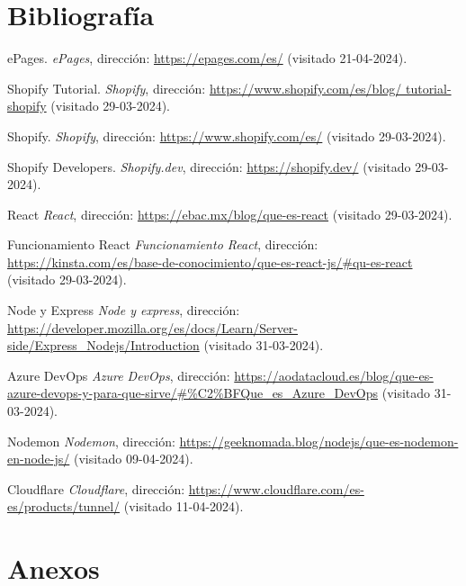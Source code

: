 \documentclass[12pt]{article}
\begin{document}
\section{Bibliografía}
\renewcommand{\refname}{}
\begin{thebibliography}{100} %
    
    ePages. 
    \textit{ePages}, dirección: \url{https://epages.com/es/} (visitado 21-04-2024).

    Shopify Tutorial. 
    \textit{Shopify}, dirección: \url{https://www.shopify.com/es/blog/
    tutorial-shopify} (visitado 29-03-2024).

    Shopify. 
    \textit{Shopify}, dirección: \url{https://www.shopify.com/es/} (visitado 29-03-2024).

    Shopify Developers. 
    \textit{Shopify.dev}, dirección: \url{https://shopify.dev/} (visitado 29-03-2024).

    React
    \textit{React}, dirección: \url{https://ebac.mx/blog/que-es-react} (visitado 29-03-2024).

    Funcionamiento React
    \textit{Funcionamiento React}, dirección: \url{https://kinsta.com/es/base-de-conocimiento/que-es-react-js/#qu-es-react} (visitado 29-03-2024).

    Node y Express
    \textit{Node y express}, dirección: \url{https://developer.mozilla.org/es/docs/Learn/Server-side/Express_Nodejs/Introduction} (visitado 31-03-2024).

    Azure DevOps
    \textit{Azure DevOps}, dirección: \url{https://aodatacloud.es/blog/que-es-azure-devops-y-para-que-sirve/#%C2%BFQue_es_Azure_DevOps} (visitado 31-03-2024).

    Nodemon
    \textit{Nodemon}, dirección: \url{https://geeknomada.blog/nodejs/que-es-nodemon-en-node-js/} (visitado 09-04-2024).

    Cloudflare
    \textit{Cloudflare}, dirección: \url{https://www.cloudflare.com/es-es/products/tunnel/} (visitado 11-04-2024).

\end{thebibliography}

\newpage
\section{Anexos}
\end{document}
